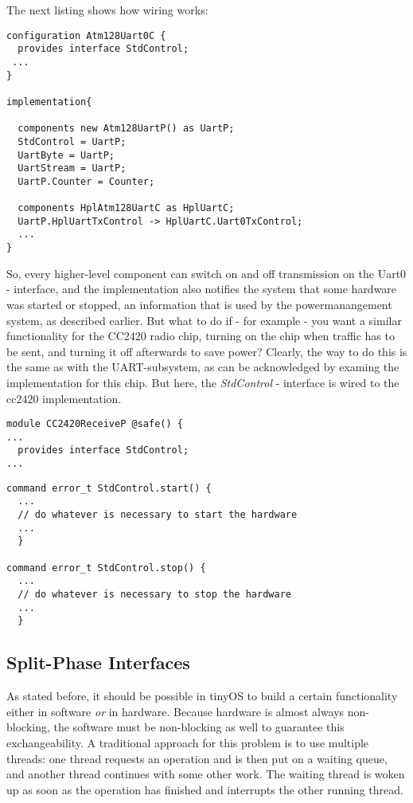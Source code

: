 The next listing shows how wiring works: 

\lstset{language=C}
\begin{lstlisting}
configuration Atm128Uart0C {
  provides interface StdControl;
 ...
}

implementation{

  components new Atm128UartP() as UartP;
  StdControl = UartP;
  UartByte = UartP;
  UartStream = UartP;
  UartP.Counter = Counter;

  components HplAtm128UartC as HplUartC;
  UartP.HplUartTxControl -> HplUartC.Uart0TxControl;
  ...
}
\end{lstlisting}

So, every higher-level component can switch on and off transmission on the Uart0 - interface, and the implementation also notifies the system that some hardware was started or stopped, an information that is used by the powermanangement system, as described earlier. But what to do if - for example - you want a similar functionality for the CC2420 radio chip, turning on the chip when traffic has to be sent, and turning it off afterwards to save power? Clearly, the way to do this is the same as with the UART-subsystem, as can be acknowledged by examing the implementation for this chip. But here, the \textit{StdControl} - interface is wired to the cc2420 implementation.

\lstset{language=C}
\begin{lstlisting}
module CC2420ReceiveP @safe() {
...
  provides interface StdControl;
...
\end{lstlisting}

\lstset{language=C}
\begin{lstlisting}
command error_t StdControl.start() {
  ...
  // do whatever is necessary to start the hardware
  ...
  }

command error_t StdControl.stop() {
  ...
  // do whatever is necessary to stop the hardware
  ...
  }

\end{lstlisting}

\subsection{Split-Phase Interfaces}

As stated before, it should be possible in tinyOS to build a certain functionality either in software \textit{or} in hardware. Because hardware is almost always non-blocking, the software must be non-blocking as well to guarantee this exchangeability. A traditional approach for this problem is to use multiple threads: one thread requests an operation and is then put on a waiting queue, and another thread continues with some other work. The waiting thread is woken up as soon as the operation has finished and interrupts the other running thread.

